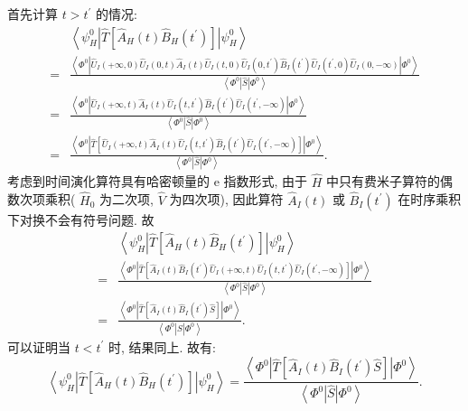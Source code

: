 首先计算 $t>t^{\prime}$ 的情况:
\begin{align}
&\left\langle\psi_{H}^{0}\left|\hat{T}\left[\hat{A}_{H}(t) \hat{B}_{H}(t^{\prime})\right]\right| \psi_{H}^{0}\right\rangle \nonumber\\
=& \frac{\left\langle\Phi^{0}\left|\hat U_I(+\infty, 0) \hat U_I(0, t) \hat{A}_{I}(t) \hat U_I(t, 0) \hat U_I\left(0, t^{\prime}\right) \hat{B}_{I}\left(t^{\prime}\right) \hat U_I\left(t^{\prime}, 0\right) \hat U_I(0,-\infty)\right| \Phi^{0}\right\rangle}{\left\langle\Phi^{0}\right|\hat S\left| \Phi^{0}\right\rangle} \nonumber\\
=& \frac{\left\langle\Phi^{0}\left|\hat U_I(+\infty, t) \hat{A}_{I}(t) \hat U_I\left(t, t^{\prime}\right) \hat{B}_{I}\left(t^{\prime}\right) \hat U_I\left(t^{\prime},-\infty\right)\right| \Phi^{0}\right\rangle}{\left\langle\Phi^{0}\right|\hat S\left| \Phi^{0}\right\rangle}\nonumber \\
=& \frac{\left\langle\Phi^{0}\left|\hat{T}\left[\hat U_I(+\infty, t) \hat{A}_{I}(t) \hat U_I\left(t, t^{\prime}\right) \hat{B}_{I}\left(t^{\prime}\right) \hat U_I\left(t^{\prime},-\infty\right)\right]\right| \Phi^{0}\right\rangle}{\left\langle\Phi^{0}\right|\hat S\left| \Phi^{0}\right\rangle}.
\end{align}
考虑到时间演化算符具有哈密顿量的 e 指数形式, 由于 $\hat H$ 中只有费米子算符的偶数次项乘积( $\hat H_0$ 为二次项, $\hat V$ 为四次项), 因此算符 $\hat{A}_{I}(t)$ 或 $\hat{B}_{I}\left(t^{\prime}\right)$ 在时序乘积下对换不会有符号问题. 故
\begin{align}
&\left\langle\psi_{H}^{0}\left|\hat{T}\left[\hat{A}_{H}(t) \hat{B}_{H}(t^{\prime})\right]\right| \psi_{H}^{0}\right\rangle \nonumber\\
=& \frac{\left\langle\Phi^{0}\left|\hat{T}\left[\hat{A}_{I}(t) \hat{B}_{I}\left(t^{\prime}\right) \hat U_I(+\infty, t) \hat U_I\left(t, t^{\prime}\right) \hat U_I\left(t^{\prime},-\infty\right)\right]\right| \Phi^{0}\right\rangle}{\left\langle\Phi^{0}\right|\hat S\left| \Phi^{0}\right\rangle} \nonumber\\
=& \frac{\left\langle\Phi^{0}\left|\hat{T}\left[\hat{A}_{I}(t) \hat{B}_{I}\left(t^{\prime}\right) \hat{S}\right]\right| \Phi^{0}\right\rangle}{\left\langle\Phi^{0}\right|\hat{S}\left| \Phi^{0}\right\rangle}.
\end{align}
可以证明当 $t<t^{\prime}$ 时, 结果同上. 故有:
\begin{equation}
\left\langle\psi_{H}^{0}\left|\hat{T}\left[\hat{A}_{H}(t) \hat{B}_{H}(t^{\prime})\right]\right| \psi_{H}^{0}\right\rangle=\frac{\left\langle\Phi^{0}\left|\hat{T}\left[\hat{A}_{I}(t) \hat{B}_{I}\left(t^{\prime}\right) \hat{S}\right]\right| \Phi^{0}\right\rangle}{\left\langle\Phi^{0}\right|\hat{S}\left| \Phi^{0}\right\rangle}.
\end{equation}
